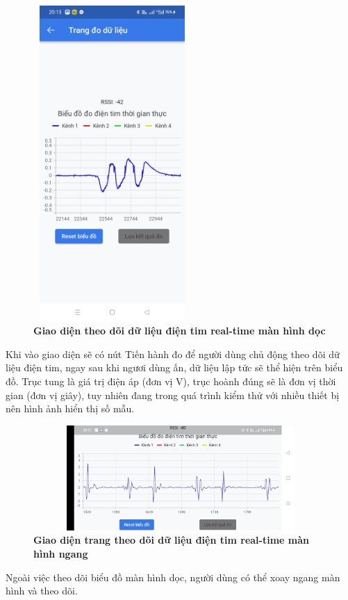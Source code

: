 \begin{figure}[H]
  \centering
  \includegraphics[width=6cm,height=12cm]{Images/mobile_app/demo/demo_real_time_chart_2.jpg}
  \caption[Giao diện trang theo dõi dữ liệu điện tim real-time màn hình dọc]{\bfseries \fontsize{12pt}{0pt}\selectfont Giao diện theo dõi dữ liệu điện tim real-time màn hình dọc}
  \label{demo_real_time_chart_2}
\end{figure}

Khi vào giao diện sẽ có nút Tiến hành đo để người dùng chủ động theo dõi dữ liệu điện tim, ngay sau khi ngươi dùng ấn, dữ liệu lập tức sẽ
thể hiện trên biểu đồ. Trục tung là giá trị điện áp (đơn vị V), trục hoành đúng sẽ là đơn vị thời gian (đơn vị giây), tuy nhiên đang trong
quá trình kiểm thử với nhiều thiết bị nên hình ảnh hiển thị số mẫu. 

\begin{figure}[H]
  \centering
  \includegraphics[width=12cm,height=4cm]{Images/mobile_app/demo/demo_real_time_chart.jpg}
  \caption[Giao diện trang theo dõi dữ liệu điện tim real-time màn hình ngang]{\bfseries \fontsize{12pt}{0pt}\selectfont Giao diện trang theo dõi dữ liệu điện tim real-time màn hình ngang}
  \label{demo_real_time_chart}
\end{figure}
Ngoài việc theo dõi biểu đồ màn hình dọc, người dùng có thể xoay ngang màn hình và theo dõi.


